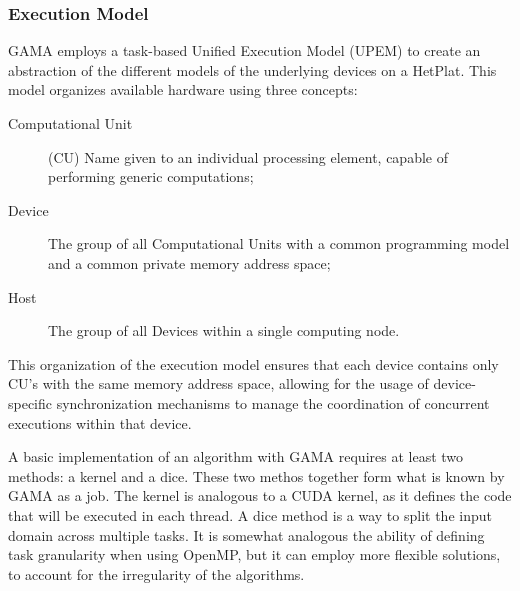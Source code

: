 \subsubsection{Execution Model}

GAMA employs a task-based Unified Execution Model (UPEM) to create an abstraction of the different models of the underlying devices on a HetPlat. This model organizes available hardware using three concepts:

\begin{description}
  \item[Computational Unit] (CU) Name given to an individual processing element, capable of performing generic computations;

  \item[Device] The group of all Computational Units with a common programming model and a common private memory address space;

  \item[Host] The group of all Devices within a single computing node.
\end{description}

This organization of the execution model ensures that each device contains only CU's with the same memory address space, allowing for the usage of device-specific synchronization mechanisms to manage the coordination of concurrent executions within that device.

A basic implementation of an algorithm with GAMA requires at least two methods: a kernel and a dice. These two methos together form what is known by GAMA as a job. The kernel is analogous to a CUDA kernel, as it defines the code that will be executed in each thread. A dice method is a way to split the input domain across multiple tasks. It is somewhat analogous the ability of defining task granularity when using OpenMP, but it can employ more flexible solutions, to account for the irregularity of the algorithms.
